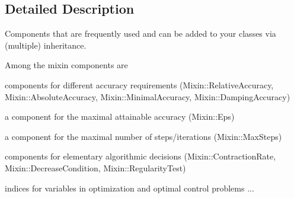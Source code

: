 \subsection{Detailed Description}
Components that are frequently used and can be added to your classes via (multiple) inheritance. 

Among the mixin components are
\begin{DoxyItemize}
\item components for different accuracy requirements (Mixin\+::\+Relative\+Accuracy, Mixin\+::\+Absolute\+Accuracy, Mixin\+::\+Minimal\+Accuracy, Mixin\+::\+Damping\+Accuracy)
\item a component for the maximal attainable accuracy (Mixin\+::\+Eps)
\item a component for the maximal number of steps/iterations (Mixin\+::\+Max\+Steps)
\item components for elementary algorithmic decisions (Mixin\+::\+Contraction\+Rate, Mixin\+::\+Decrease\+Condition, Mixin\+::\+Regularity\+Test)
\item indices for variables in optimization and optimal control problems ... 
\end{DoxyItemize}
